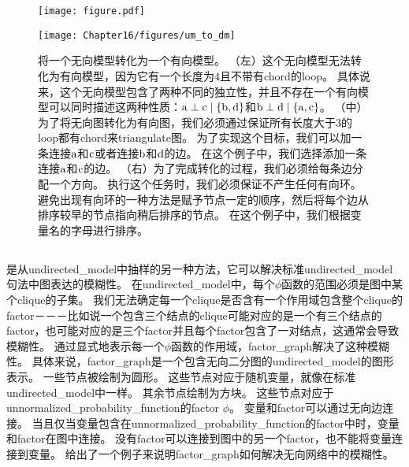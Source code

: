 \begin{figure}[!htb]
\ifOpenSource
\centerline{\texttt{[image: figure.pdf]}}
\else
	\centerline{\texttt{[image: Chapter16/figures/um\_to\_dm]}}	
\fi
\caption{将一个无向模型转化为一个有向模型。
（左）这个无向模型无法转化为有向模型，因为它有一个长度为$4$且不带有\gls{chord}的\gls{loop}。
具体说来，这个无向模型包含了两种不同的独立性，并且不存在一个有向模型可以同时描述这两种性质：$\mathrm{a}\perp \mathrm{c} \mid \{\mathrm{b},\mathrm{d}\}$和$\mathrm{b} \perp \mathrm{d} \mid \{\mathrm{a},\mathrm{c}\}$。
（中）为了将无向图转化为有向图，我们必须通过保证所有长度大于$3$的\gls{loop}都有\gls{chord}来\gls{triangulate}图。
为了实现这个目标，我们可以加一条连接$\mathrm{a}$和$\mathrm{c}$或者连接$\mathrm{b}$和$\mathrm{d}$的边。
在这个例子中，我们选择添加一条连接$\mathrm{a}$和$\mathrm{c}$的边。
（右）为了完成转化的过程，我们必须给每条边分配一个方向。
执行这个任务时，我们必须保证不产生任何有向环。
避免出现有向环的一种方法是赋予节点一定的顺序，然后将每个边从排序较早的节点指向稍后排序的节点。
在这个例子中，我们根据变量名的字母进行排序。}
	\label{fig:um_to_dm}
\end{figure}



\subsection{}
\label{sec:factor_graphs}



是从\gls{undirected_model}中抽样的另一种方法，它可以解决标准\gls{undirected_model}句法中图表达的模糊性。
在\gls{undirected_model}中，每个$\phi$函数的范围必须是图中某个\gls{clique}的子集。
我们无法确定每一个\gls{clique}是否含有一个作用域包含整个\gls{clique}的\gls{factor}－－－比如说一个包含三个结点的\gls{clique}可能对应的是一个有三个结点的\gls{factor}，也可能对应的是三个\gls{factor}并且每个\gls{factor}包含了一对结点，这通常会导致模糊性。
通过显式地表示每一个$\phi$函数的作用域，\gls{factor_graph}解决了这种模糊性。
具体来说，\gls{factor_graph}是一个包含无向二分图的\gls{undirected_model}的图形表示。
一些节点被绘制为圆形。 
这些节点对应于随机变量，就像在标准\gls{undirected_model}中一样。
其余节点绘制为方块。
这些节点对应于\gls{unnormalized_probability_function}的\gls{factor} $\phi$。
变量和\gls{factor}可以通过无向边连接。
当且仅当变量包含在\gls{unnormalized_probability_function}的\gls{factor}中时，变量和\gls{factor}在图中连接。
没有\gls{factor}可以连接到图中的另一个\gls{factor}，也不能将变量连接到变量。
给出了一个例子来说明\gls{factor_graph}如何解决无向网络中的模糊性。


